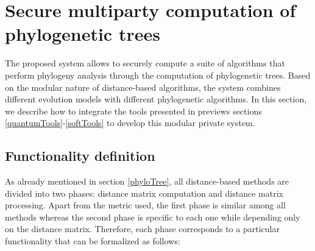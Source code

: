 \section{Secure multiparty computation of phylogenetic trees} \label{smcPhylo}

The proposed system allows to securely compute a suite of algorithms that perform phylogeny analysis through the computation of phylogenetic trees. Based on the modular nature of distance-based algorithms, the system combines different evolution models with different phylogenetic algorithms. In this section, we describe how to integrate the tools presented in previews sections \ref{quantumTools}-\ref{softTools} to develop this modular private system. 



\subsection{Functionality definition}\label{Functionality}

As already mentioned in section \ref{phyloTree}, all distance-based methods are divided into two phases: distance matrix computation and distance matrix processing. Apart from the metric used, the first phase is similar among all methods whereas the second phase is specific to each one while depending only on the distance matrix. Therefore, each phase corresponds to a particular functionality that can be formalized as follows: 

